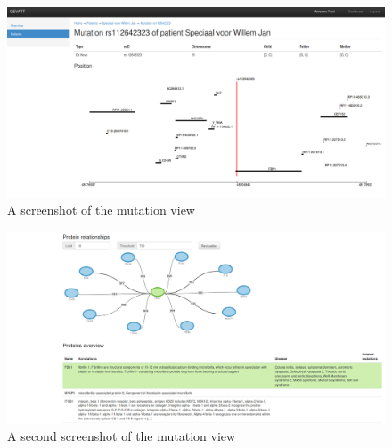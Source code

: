 \begin{figure}[H]
\includegraphics[scale=0.2]{mutation.png}
\caption{A screenshot of the mutation view}
\label{fig:mutation}
\end{figure} 
\begin{figure}[H]
\includegraphics[scale=0.2]{mutation2.png}
\caption{A second screenshot of the mutation view}
\label{fig:mutation2}
\end{figure} 